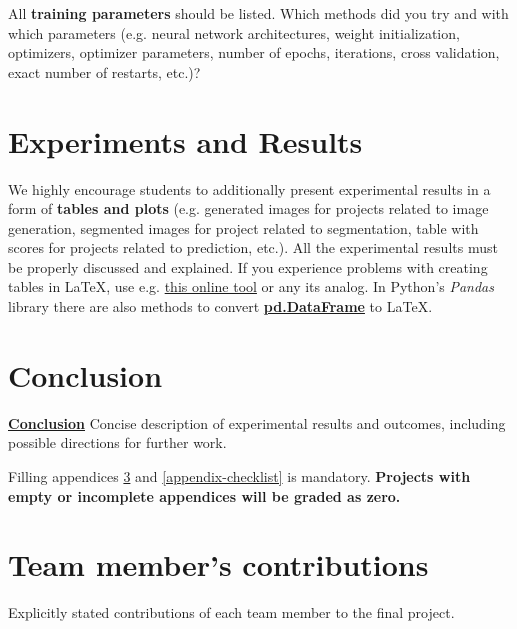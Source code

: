\documentclass{article}
\begin{document}
All \textbf{training parameters} should be listed. Which methods did you try and with which parameters (e.g. neural network architectures, weight initialization, optimizers, optimizer parameters, number of epochs, iterations, cross validation, exact number of restarts, etc.)?

\section{Experiments and Results}\label{experiments_and_results}

We highly encourage students to additionally present experimental results in a form of \textbf{tables and plots} (e.g. generated images for projects related to image generation, segmented images for project related to segmentation, table with scores for projects related to prediction, etc.). All the experimental results must be properly discussed and explained. If you experience problems with creating tables in \LaTeX, use e.g. \href{https://www.tablesgenerator.com}{this online tool} or any its analog. In Python's \textit{Pandas} library there are also methods to convert \href{https://pandas.pydata.org/pandas-docs/stable/reference/api/pandas.DataFrame.to_latex.html}{\textbf{pd.DataFrame}} to \LaTeX  .

\section{Conclusion}\label{conclusion}

\underline{\textbf{Conclusion}} Concise description of experimental results and outcomes, including possible directions for further work.

Filling appendices \ref{appendix-contrib} and  \ref{appendix-checklist} is mandatory. \textbf{Projects with empty or incomplete appendices will be graded as zero.}



\clearpage


\newpage
\appendix
\section{Team member's contributions}
\label{appendix-contrib}
Explicitly stated contributions of each team member to the final project.
\end{document}

